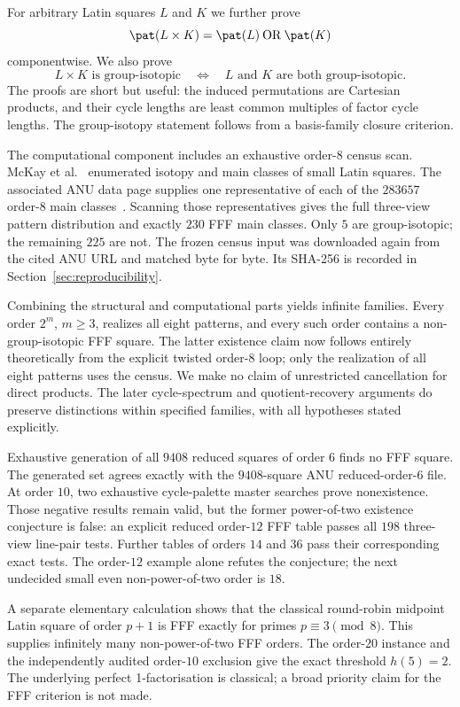 For arbitrary Latin squares $L$ and $K$ we further prove
\[
  \pat(L\times K)=\pat(L)\mathbin{\mathrm{OR}}\pat(K)
\]
componentwise.  We also prove
\[
  L\times K\text{ is group-isotopic}
  \quad\Longleftrightarrow\quad
  L\text{ and }K\text{ are both group-isotopic}.
\]
The proofs are short but useful: the induced permutations are Cartesian
products, and their cycle lengths are least common multiples of factor cycle
lengths.  The group-isotopy statement follows from a basis-family closure
criterion.

The computational component includes an exhaustive order-$8$ census scan.
McKay et al.~\cite{McKayMeynertMyrvold2007} enumerated isotopy and main
classes of small Latin squares.  The associated ANU data page supplies one
representative of each of the $283657$ order-$8$ main
classes~\cite{McKayLatinData}.  Scanning those representatives gives the full
three-view pattern distribution and exactly $230$ FFF main classes.  Only
$5$ are group-isotopic; the remaining $225$ are not.  The frozen census
input was downloaded again from the cited ANU URL and matched byte for
byte.  Its SHA-256 is recorded in Section~\ref{sec:reproducibility}.

Combining the structural and computational parts yields infinite families.
Every order $2^m$, $m\geq 3$, realizes all eight patterns, and every such
order contains a non-group-isotopic FFF square.  The latter existence claim
now follows entirely theoretically from the explicit twisted order-$8$ loop;
only the realization of all eight patterns uses the census.  We make no claim
of unrestricted cancellation for direct products. The later
cycle-spectrum and quotient-recovery arguments do preserve distinctions
within specified families, with all hypotheses stated explicitly.

Exhaustive generation of all $9408$ reduced squares of order $6$
finds no FFF square.  The generated set agrees exactly with the $9408$-square
ANU reduced-order-$6$ file.  At order $10$, two exhaustive cycle-palette
master searches prove nonexistence.  Those negative results remain valid, but
the former power-of-two existence conjecture is false: an explicit reduced
order-$12$ FFF table passes all $198$ three-view line-pair tests.  Further
tables of orders $14$ and $36$ pass their corresponding exact tests.  The
order-$12$ example alone refutes the conjecture; the next undecided small
even non-power-of-two order is $18$.

A separate elementary calculation shows that the classical round-robin
midpoint Latin square of order $p+1$ is FFF exactly for primes
$p\equiv3\pmod8$. This supplies infinitely many non-power-of-two FFF
orders. The order-$20$ instance and the independently audited order-$10$
exclusion give the exact threshold $h(5)=2$. The underlying perfect
1-factorisation is classical; a broad priority claim for the FFF criterion
is not made.

